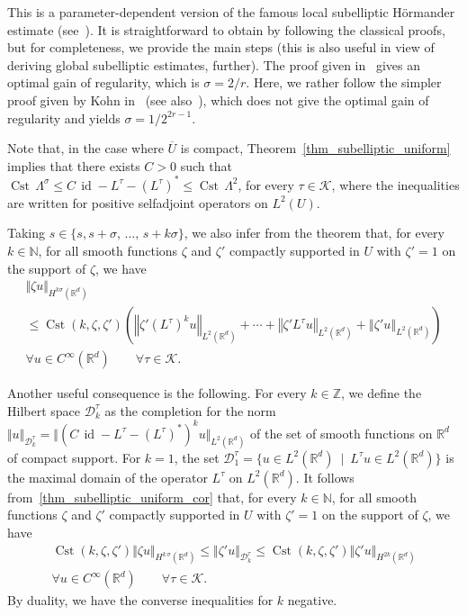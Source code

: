 \documentclass[AHL,Unicode,published]{cedram}
\newcommand*\R{\mathbb{R}}
\newcommand*\N{\mathbb{N}}
\newcommand*\Z{\mathbb{Z}}
\newcommand{\calK}{\mathcal{K}}
\newcommand{\calD}{\mathcal{D}}
\DeclareMathOperator{\Cst}{Cst}
\DeclareMathOperator{\id}{id}
\renewcommand{\leq}{\leqslant}
\let\oldforall\forall
\renewcommand*{\forall}{\mathrel{\oldforall}}
\begin{document}
This is a parameter-dependent version of the famous local subelliptic H\"ormander estimate (see~\cite{Ho-67}). It is straightforward to obtain by following the classical proofs, but for completeness, we provide the main steps (this is also useful in view of deriving global subelliptic estimates, further). The proof given in~\cite{Ho-67} gives an optimal gain of regularity, which is $\sigma=2/r$. Here, we rather follow the simpler proof given by Kohn in~\cite{Kohn1973} (see also~\cite{HelfferNier}), which does not give the optimal gain of regularity and yields $\sigma=1/2^{2r-1}$.

Note that, in the case where $\overline{U}$ is compact, Theorem~\ref{thm_subelliptic_uniform} implies that there exists $C>0$ such that $\Cst\, \Lambda^{\sigma} \leq C\,\id - L^\tau - (L^\tau)^* \leq \Cst\, \Lambda^2$, for every $\tau\in\calK$, where the inequalities are written for positive selfadjoint operators on $L^2(U)$.


Taking $s\in\{s,s+\sigma,\,\ldots,\,s+k\sigma\}$, we also infer from the theorem that, for every $k\in\N$, for all smooth functions $\zeta$ and $\zeta'$ compactly supported in $U$ with $\zeta'=1$ on the support of $\zeta$, we have
\begin{multline}\label{thm_subelliptic_uniform_cor}
\Vert \zeta u\Vert_{H^{k\sigma}\left(\R^d\right)} \\
\leq \Cst\left(k,\zeta,\zeta'\right) \left(\left\Vert \zeta' (L^\tau)^k u\right\Vert_{L^2\left(\R^d\right)} + \cdots+\left\Vert \zeta' L^\tau u\right\Vert_{L^2\left(\R^d\right)} + \left\Vert \zeta' u \right\Vert_{L^2\left(\R^d\right)} \right) \\
\forall u\in C^\infty\left(\R^d\right)\qquad \forall \tau\in\calK.
\end{multline}

Another useful consequence is the following. For every $k\in\Z$, we define the Hilbert space $\calD^\tau_k$ as the completion for the norm $\Vert u\Vert_{\calD^\tau_k} = \Vert (C\,\id - L^\tau - (L^\tau)^*)^k u\Vert_{L^2(\R^d)}$ of the set of smooth functions on $\R^d$ of compact support. For $k=1$, the set $\calD^\tau_1=\{ u\in L^2(\R^d)\ \mid\ L^\tau u\in L^2(\R^d)\}$ is the maximal domain of the operator $L^\tau$ on $L^2(\R^d)$. It follows from~\eqref{thm_subelliptic_uniform_cor} that, for every $k\in\N$, for all smooth functions $\zeta$ and $\zeta'$ compactly supported in $U$ with $\zeta'=1$ on the support of $\zeta$, we have
\begin{multline*}
\Cst(k,\zeta,\zeta') \Vert \zeta u \Vert_{H^{k\,\sigma}(\R^d)} \leq \Vert \zeta' u \Vert_{\calD^\tau_k } \leq \Cst(k,\zeta,\zeta') \Vert \zeta' u \Vert_{H^{2k}\left(\R^d\right)} \\
\forall u\in C^\infty\left(\R^d\right)\qquad \forall \tau\in\calK.
\end{multline*}
By duality, we have the converse inequalities for $k$ negative.
\end{document}
